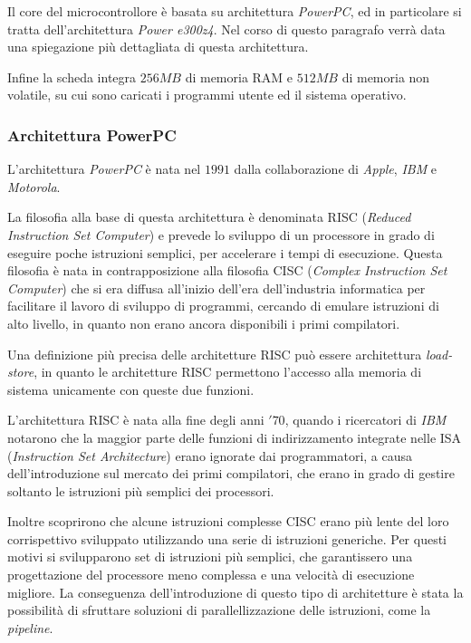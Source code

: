 Il core del microcontrollore è basata su architettura \textit{PowerPC}, ed in particolare si tratta dell'architettura \textit{Power e300z4}. Nel corso di questo paragrafo verrà data una spiegazione più dettagliata di questa architettura.

Infine la scheda integra $256MB$ di memoria RAM e $512MB$ di memoria non volatile, su cui sono caricati i programmi utente ed il sistema operativo.

\subsubsection{Architettura PowerPC}
L'architettura \textit{PowerPC} è nata nel $1991$ dalla collaborazione di \textit{Apple}, \textit{IBM} e \textit{Motorola}. 

La filosofia alla base di questa architettura è denominata RISC (\textit{Reduced Instruction Set Computer}) e prevede lo sviluppo di un processore in grado di eseguire poche istruzioni semplici, per accelerare i tempi di esecuzione. Questa filosofia è nata in contrapposizione alla filosofia CISC (\textit{Complex Instruction Set Computer}) che si era diffusa all'inizio dell'era dell'industria informatica per facilitare il lavoro di sviluppo di programmi, cercando di emulare istruzioni di alto livello, in quanto non erano ancora disponibili i primi compilatori.

Una definizione più precisa delle architetture RISC può essere architettura \textit{load-store}, in quanto le architetture RISC permettono l'accesso alla memoria di sistema unicamente con queste due funzioni.

L'architettura RISC è nata alla fine degli anni $'70$, quando i ricercatori di \textit{IBM} notarono che la maggior parte delle funzioni di indirizzamento integrate nelle ISA (\textit{Instruction Set Architecture}) erano ignorate dai programmatori, a causa dell'introduzione sul mercato dei primi compilatori, che erano in grado di gestire soltanto le istruzioni più semplici dei processori.

Inoltre scoprirono che alcune istruzioni complesse CISC erano più lente del loro corrispettivo sviluppato utilizzando una serie di istruzioni generiche. Per questi motivi si svilupparono set di istruzioni più semplici, che garantissero una progettazione del processore meno complessa e una velocità di esecuzione migliore.
La conseguenza dell'introduzione di questo tipo di architetture è stata la possibilità di sfruttare soluzioni di parallellizzazione delle istruzioni, come la \textit{pipeline}.

